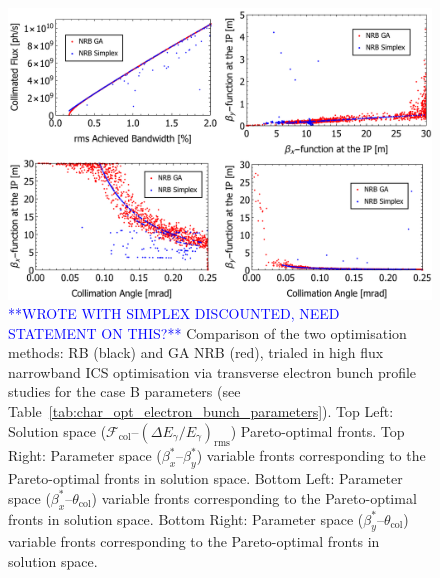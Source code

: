 \documentclass[../main.tex]{subfiles}
\begin{document}
\begin{figure}[!h]
\centering
\includegraphics[width=\textwidth]{Figures/Optimisation_and_Characterisation_of_Inverse_Compton_Scattering_Sources/CaseBoptcomp.pdf}
\caption{\textcolor{blue}{**WROTE WITH SIMPLEX DISCOUNTED, NEED STATEMENT ON THIS?**} Comparison of the two optimisation methods: RB (black) and GA NRB (red), trialed in high flux narrowband ICS optimisation via transverse electron bunch profile studies for the case B parameters (see Table~\ref{tab:char_opt_electron_bunch_parameters}). Top Left: Solution space ($\mathcal{F}_{\mathrm{col}}$--$\left(\Delta E_{\gamma}/E_{\gamma}\right)_{\mathrm{rms}}$) Pareto-optimal fronts. Top Right: Parameter space ($\beta_{x}^{*}$--$\beta_{y}^{*}$) variable fronts corresponding to the Pareto-optimal fronts in solution space. Bottom Left: Parameter space ($\beta_{x}^{*}$--$\theta_{\mathrm{col}}$) variable fronts corresponding to the Pareto-optimal fronts in solution space. Bottom Right: Parameter space ($\beta_{y}^{*}$--$\theta_{\mathrm{col}}$) variable fronts corresponding to the Pareto-optimal fronts in solution space.}
\label{fig:case_B_optimisation_comparison)}
\end{figure}
\end{document}
